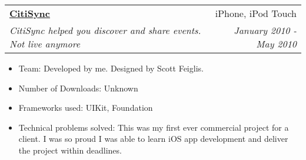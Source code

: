 \documentclass[letterpaper,11pt]{article}
\makeatletter
\newcommand{\resitem}[1]{\item #1 \vspace{-2pt}}
\newcommand{\ressubheading}[4]{
\begin{tabular*}{7.0in}{l@{\extracolsep{\fill}}r}
		\textbf{#1} & #2 \\
		\textit{#3} & \textit{#4} \\
\end{tabular*}\vspace{-6pt}}
\makeatother
\begin{document}
\begin{itemize}
  \ressubheading{\href{http://www.alligator.org/news/campus/article_8fe50876-c78b-11df-96a3-001cc4c03286.html}{CitiSync}}{iPhone, iPod Touch}{CitiSync helped you discover and share events. Not live anymore}{January 2010 - May 2010}
  \begin{itemize}
        \resitem{Team: Developed by me. Designed by Scott Feiglis. }
        \resitem{Number of Downloads: Unknown}
        \resitem{Frameworks used: UIKit, Foundation}
        \resitem{Technical problems solved:  This was my first ever commercial project for a client. I was so proud I was able to learn iOS app development and deliver the project within deadlines. }
    \end{itemize}
\end{itemize}

\vspace{0.3in}
\end{document}
